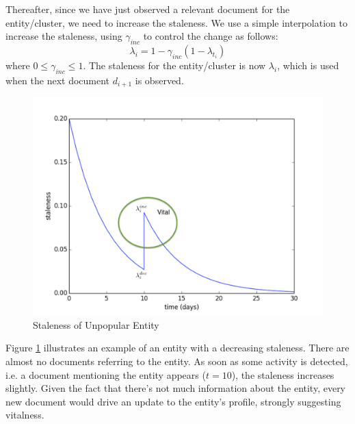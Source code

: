 \documentclass{article}
\begin{document}
Thereafter, since we have just observed a relevant document for the entity/cluster, we need to increase the staleness. 
We use a simple interpolation to increase the staleness, using $\gamma_{inc}$ to control the change as follows:
\begin{equation}
\lambda_i = 1 - \gamma_{inc}(1 - \lambda_{t_i})
\end{equation}
where $0 \leq \gamma_{inc} \leq 1$.
The staleness for the entity/cluster is now $\lambda_i$, which is used when the next document $d_{i+1}$ is observed.

\begin{figure}[tb]
\centering
\includegraphics[width=0.7\columnwidth]{fig/staleness1.pdf}
\caption{Staleness of Unpopular Entity}
\label{stalenesslow}
\end{figure}

Figure \ref{stalenesslow} illustrates an example of an entity with a decreasing staleness. 
There are almost no documents referring to the entity. 
As soon as some activity is detected, i.e. a document mentioning the entity appears ($t=10$), the staleness increases slightly. 
Given the fact that there's not much information about the entity, every new document would drive an update to the entity's profile, strongly suggesting vitalness.
\end{document}
